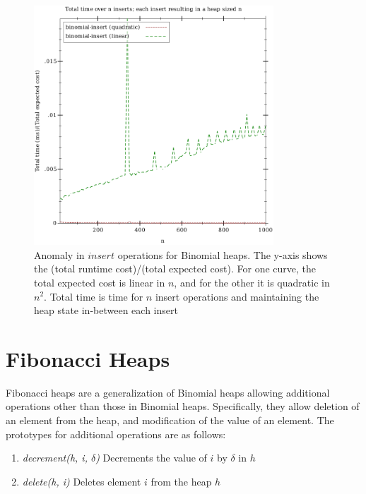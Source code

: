 \documentclass{llncs}
\begin{document}
\begin{figure}
	\begin{center}
		\includegraphics[width=0.8\textwidth]{FIG/insert_binomial.pdf}
	\end{center}
	\caption{Anomaly in $insert$ operations for Binomial heaps. The y-axis shows the (total runtime cost)/(total expected cost). For one curve, the total expected cost is linear in $n$, and for the other it is quadratic in $n^2$. Total time is time for $n$ insert operations and maintaining the heap state in-between each insert}
	\label{fig:bino_anomaly}
\end{figure}

\section{Fibonacci Heaps}
Fibonacci heaps are a generalization of Binomial heaps allowing additional operations other than those in Binomial heaps. Specifically, they allow deletion of an element from the heap, and modification of the value of an element. The prototypes for additional operations are as follows: \\

\begin{enumerate}
	\item \emph{decrement(h, i, $\delta$)} Decrements the value of $i$ by $\delta$ in $h$
	\item \emph{delete(h, i)} Deletes element $i$ from the heap $h$ 
\end{enumerate}
\end{document}
